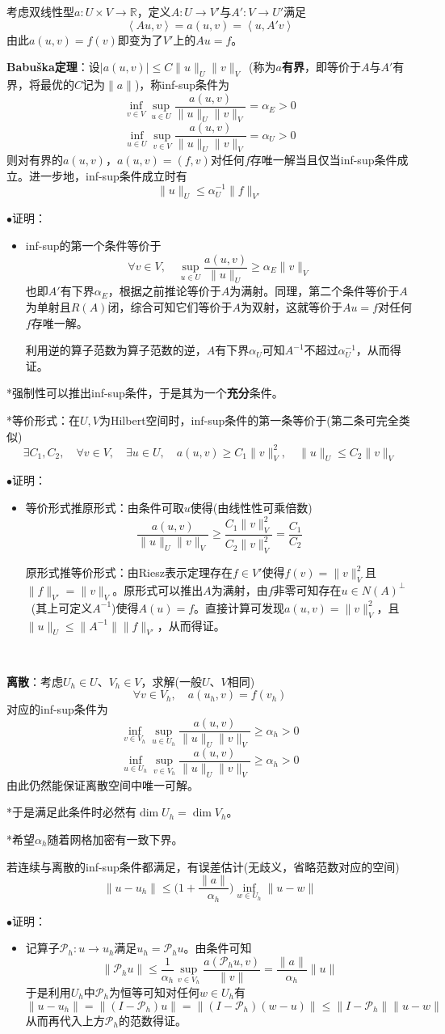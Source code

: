 \documentclass[a4paper,UTF8,fontset=windows]{ctexart}
\newcommand*{\cp}{\mathcal{P}}
\newcommand{\proo}[1]{{\kaishu $\bullet$证明：
\begin{itemize}
    \item[] #1
\end{itemize}
}}
\begin{document}
考虑双线性型$a:U\times V\to\mathbb{R}$，定义$A:U\to V'$与$A':V\to U'$满足
$$\left<Au,v\right>=a(u,v)=\left<u,A'v\right>$$
由此$a(u,v)=f(v)$即变为了$V'$上的$Au=f$。

\textbf{Babu\v ska定理}：设$|a(u,v)|\le C\|u\|_U\|v\|_V$\ (称为$a$\textbf{有界}，即等价于$A$与$A'$有界，将最优的$C$记为$\|a\|$)，称inf-sup条件为
$$\inf_{v\in V}\sup_{u\in U}\frac{a(u,v)}{\|u\|_U\|v\|_V}=\alpha_E>0$$
$$\inf_{u\in U}\sup_{v\in V}\frac{a(u,v)}{\|u\|_U\|v\|_V}=\alpha_U>0$$
则对有界的$a(u,v)$，$a(u,v)=(f,v)$对任何$f$存唯一解当且仅当inf-sup条件成立。进一步地，inf-sup条件成立时有
$$\|u\|_U\le\alpha_U^{-1}\|f\|_{V'}$$

\proo{
    inf-sup的第一个条件等价于
    $$\forall v\in V,\quad\sup_{u\in U}\frac{a(u,v)}{\|u\|_U}\ge\alpha_E\|v\|_V$$
    也即$A'$有下界$\alpha_E$，根据之前推论等价于$A$为满射。同理，第二个条件等价于$A$为单射且$R(A)$闭，综合可知它们等价于$A$为双射，这就等价于$Au=f$对任何$f$存唯一解。

    利用逆的算子范数为算子范数的逆，$A$有下界$\alpha_U$可知$A^{-1}$不超过$\alpha_U^{-1}$，从而得证。
}

*强制性可以推出inf-sup条件，于是其为一个\textbf{充分}条件。

*等价形式：在$U,V$为Hilbert空间时，inf-sup条件的第一条等价于(第二条可完全类似)
$$\exists C_1,C_2,\quad\forall v\in V,\quad\exists u\in U,\quad a(u,v)\ge C_1\|v\|_V^2,\quad\|u\|_U\le C_2\|v\|_V$$

\proo{
    等价形式推原形式：由条件可取$u$使得(由线性性可乘倍数)
    $$\frac{a(u,v)}{\|u\|_U\|v\|_V}\ge\frac{C_1\|v\|_V^2}{C_2\|v\|_V^2}=\frac{C_1}{C_2}$$

    原形式推等价形式：由Riesz表示定理存在$f\in V'$使得$f(v)=\|v\|_V^2$且$\|f\|_{V'}=\|v\|_V$。原形式可以推出$A$为满射，由$f$非零可知存在$u\in N(A)^\bot$\ (其上可定义$A^{-1}$)使得$A(u)=f$。直接计算可发现$a(u,v)=\|v\|_V^2$，且$\|u\|_U\le\|A^{-1}\|\|f\|_{V'}$，从而得证。
}

\

\textbf{离散}：考虑$U_h\in U$、$V_h\in V$，求解(一般$U$、$V$相同)
$$\forall v\in V_h,\quad a(u_h,v)=f(v_h)$$
对应的inf-sup条件为
$$\inf_{v\in V_h}\sup_{u\in U_h}\frac{a(u,v)}{\|u\|_U\|v\|_V}\ge\alpha_h>0$$
$$\inf_{u\in U_h}\sup_{v\in V_h}\frac{a(u,v)}{\|u\|_U\|v\|_V}\ge\alpha_h>0$$
由此仍然能保证离散空间中唯一可解。

*于是满足此条件时必然有$\dim U_h=\dim V_h$。

*希望$\alpha_h$随着网格加密有一致下界。

若连续与离散的inf-sup条件都满足，有误差估计(无歧义，省略范数对应的空间)
$$\|u-u_h\|\le\bigg(1+\frac{\|a\|}{\alpha_h}\bigg)\inf_{w\in U_h}\|u-w\|$$
\proo{
    记算子$\cp_h:u\to u_h$满足$u_h=\cp_hu$。由条件可知
    $$\|\cp_hu\|\le\frac{1}{\alpha_h}\sup_{v\in V_h}\frac{a(\cp_hu,v)}{\|v\|}=\frac{\|a\|}{\alpha_h}\|u\|$$
    于是利用$U_h$中$\cp_h$为恒等可知对任何$w\in U_h$有
    $$\|u-u_h\|=\|(I-\cp_h)u\|=\|(I-\cp_h)(w-u)\|\le\|I-\cp_h\|\|u-w\|$$
    从而再代入上方$\cp_h$的范数得证。
}
\end{document}
